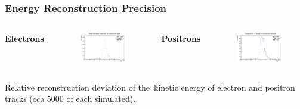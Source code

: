 \documentclass{beamer}
\begin{document}
	\begin{frame}
		\frametitle{Energy Reconstruction Precision}
		\centering
		\begin{columns}
			\centering
			\Large \textbf{Electrons}
			\begin{figure}
				\centering
				\includegraphics[width = 0.95 \linewidth]{../images/c_e_delta_energy.png}
			\end{figure}
			\centering
			\Large \textbf{Positrons}
			\begin{figure}
				\centering
				\includegraphics[width = 0.95 \linewidth]{../images/c_p_delta_energy.png}
			\end{figure}
		\end{columns}
		\vspace{0.5cm}
		\footnotesize{Relative reconstruction deviation of the~kinetic energy of electron and positron tracks (cca 5000 of each simulated).}
	\end{frame}
\end{document}
